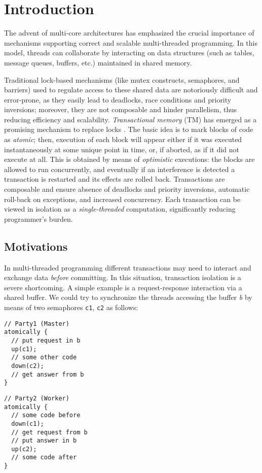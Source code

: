 
\chapter{Introduction}

The advent of multi-core architectures has emphasized the crucial importance of mechanisms supporting correct and scalable multi-threaded programming.
In this model, threads can collaborate by interacting on data structures (such as tables, message queues, buffers, etc.) maintained in shared memory.

Traditional lock-based mechanisms (like mutex constructs, semaphores, and barriers) used to regulate access to these shared data are notoriously difficult and error-prone, as they easily lead to deadlocks, race conditions and priority inversions; moreover, they are not composable and hinder parallelism, thus reducing efficiency and scalability.
\emph{Transactional memory} (TM) has emerged as a promising mechanism to replace locks \cite{moss:transactionalmemorybook,st:dc1997}.  The basic idea is to mark blocks of code as \emph{atomic}; then, execution of each block will appear either if it was executed instantaneously at some unique point in time, or, if aborted, as if it did not execute at all. This is obtained by means of \emph{optimistic} executions: the blocks are allowed to run concurrently, and eventually if an interference is detected a transaction is restarted and its effects are rolled back.
Transactions are composable and ensure absence of deadlocks and  priority inversions, automatic roll-back on exceptions, and increased concurrency.  Each transaction can be viewed in isolation as a \emph{single-threaded} computation, significantly reducing programmer's burden.

\section{Motivations}

In multi-threaded programming different transactions may need to interact and exchange data \emph{before} committing.
In this situation, transaction isolation is a severe shortcoming.
A simple example is a request-response interaction via a shared buffer.
We could try to synchronize the threads accessing the buffer \emph{b} by means of two semaphores \verb|c1|, \verb|c2| as follows:
\\[0.6ex]
\begin{BVerbatim}[baseline=t]
// Party1 (Master)
atomically {
  // put request in b
  up(c1);
  // some other code
  down(c2);
  // get answer from b
}
\end{BVerbatim}
\hfill
\begin{BVerbatim}[baseline=t]
// Party2 (Worker)
atomically {
  // some code before
  down(c1);
  // get request from b
  // put answer in b
  up(c2);
  // some code after
}
\end{BVerbatim}

